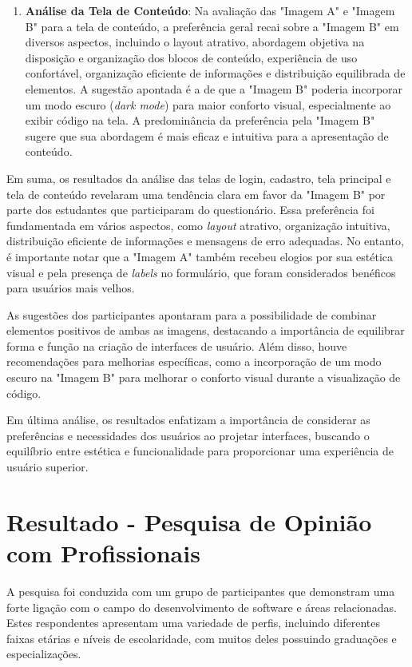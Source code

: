 \begin{enumerate}
    \item \textbf{Análise da Tela de Conteúdo}: Na avaliação das "Imagem A" e "Imagem B" para a tela de conteúdo, a preferência geral recai sobre a "Imagem B" em diversos aspectos, incluindo o layout atrativo, abordagem objetiva na disposição e organização dos blocos de conteúdo, experiência de uso confortável, organização eficiente de informações e distribuição equilibrada de elementos. A sugestão apontada é a de que a "Imagem B" poderia incorporar um modo escuro (\textit{dark mode}) para maior conforto visual, especialmente ao exibir código na tela. A predominância da preferência pela "Imagem B" sugere que sua abordagem é mais eficaz e intuitiva para a apresentação de conteúdo.
\end{enumerate}

Em suma, os resultados da análise das telas de login, cadastro, tela principal e tela de conteúdo revelaram uma tendência clara em favor da "Imagem B" por parte dos estudantes que participaram do questionário. Essa preferência foi fundamentada em vários aspectos, como \textit{layout} atrativo, organização intuitiva, distribuição eficiente de informações e mensagens de erro adequadas. No entanto, é importante notar que a "Imagem A" também recebeu elogios por sua estética visual e pela presença de \textit{labels} no formulário, que foram considerados benéficos para usuários mais velhos.

As sugestões dos participantes apontaram para a possibilidade de combinar elementos positivos de ambas as imagens, destacando a importância de equilibrar forma e função na criação de interfaces de usuário. Além disso, houve recomendações para melhorias específicas, como a incorporação de um modo escuro na "Imagem B" para melhorar o conforto visual durante a visualização de código.

Em última análise, os resultados enfatizam a importância de considerar as preferências e necessidades dos usuários ao projetar interfaces, buscando o equilíbrio entre estética e funcionalidade para proporcionar uma experiência de usuário superior.



\section{Resultado - Pesquisa de Opinião com Profissionais}
\label{Pesquisa_de_Opinião_com_Profissionais}
A pesquisa foi conduzida com um grupo de participantes que demonstram uma forte ligação com o campo do desenvolvimento de software e áreas relacionadas. Estes respondentes apresentam uma variedade de perfis, incluindo diferentes faixas etárias e níveis de escolaridade, com muitos deles possuindo graduações e especializações.

